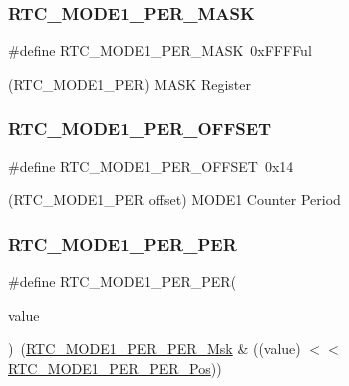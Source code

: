 \subsubsection{\texorpdfstring{RTC\_MODE1\_PER\_MASK}{RTC\_MODE1\_PER\_MASK}}
{\footnotesize\ttfamily \#define R\+T\+C\+\_\+\+M\+O\+D\+E1\+\_\+\+P\+E\+R\+\_\+\+M\+A\+SK~0x\+F\+F\+F\+Ful}



(R\+T\+C\+\_\+\+M\+O\+D\+E1\+\_\+\+P\+ER) M\+A\+SK Register 

\mbox{\label{group___s_a_m_d21___r_t_c_gae19b86968346ad8b2348b43fb6a95da4}} 
\subsubsection{\texorpdfstring{RTC\_MODE1\_PER\_OFFSET}{RTC\_MODE1\_PER\_OFFSET}}
{\footnotesize\ttfamily \#define R\+T\+C\+\_\+\+M\+O\+D\+E1\+\_\+\+P\+E\+R\+\_\+\+O\+F\+F\+S\+ET~0x14}



(R\+T\+C\+\_\+\+M\+O\+D\+E1\+\_\+\+P\+ER offset) M\+O\+D\+E1 Counter Period 

\mbox{\label{group___s_a_m_d21___r_t_c_gaa8cff11e7bc107339d32c99b10417677}} 
\subsubsection{\texorpdfstring{RTC\_MODE1\_PER\_PER}{RTC\_MODE1\_PER\_PER}}
{\footnotesize\ttfamily \#define R\+T\+C\+\_\+\+M\+O\+D\+E1\+\_\+\+P\+E\+R\+\_\+\+P\+ER(\begin{DoxyParamCaption}\item[{}]{value }\end{DoxyParamCaption})~(\mbox{\hyperlink{group___s_a_m_d21___r_t_c_ga76004ab3fe0d4f47aed34643f28dcfda}{R\+T\+C\+\_\+\+M\+O\+D\+E1\+\_\+\+P\+E\+R\+\_\+\+P\+E\+R\+\_\+\+Msk}} \& ((value) $<$$<$ \mbox{\hyperlink{group___s_a_m_d21___r_t_c_ga22b3aac719285a9cb2cc7c00f2c6ec6d}{R\+T\+C\+\_\+\+M\+O\+D\+E1\+\_\+\+P\+E\+R\+\_\+\+P\+E\+R\+\_\+\+Pos}}))}

